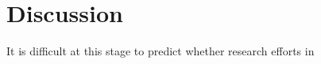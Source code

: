 \section{Discussion}
\label{sec:Discussion}


It is difficult at this stage to predict whether research efforts in
